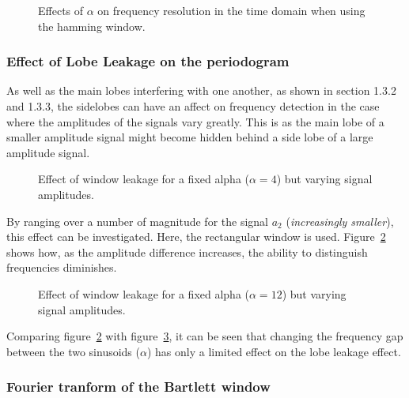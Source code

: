 \documentclass[main.tex]{subfiles}
\begin{document}
\begin{figure}[H]
	\centering 
	\resizebox{\textwidth}{!}{}
	\caption{Effects of $\alpha$ on frequency resolution in the time domain when using the hamming window.}
	\label{fig:q1_3_c}
\end{figure}


\subsubsection{Effect of Lobe Leakage on the periodogram}

As well as the main lobes interfering with one another, as shown in section 1.3.2 and 1.3.3, the sidelobes can have an affect on frequency detection in the case where the amplitudes of the signals vary greatly. This is as the main lobe of a smaller amplitude signal might become hidden behind a side lobe of a large amplitude signal.

\begin{figure}[H]
	\centering 
	\resizebox{\textwidth}{!}{}
	\caption{Effect of window leakage for a fixed alpha ($\alpha=4$) but varying signal amplitudes.}
	\label{fig:q1_3_d-4}
\end{figure}

By ranging over a number of magnitude for the signal $a_2$ (\textit{increasingly smaller}), this effect can be investigated. Here, the rectangular window is used. Figure~\ref{fig:q1_3_d-4} shows how, as the amplitude difference increases, the ability to distinguish frequencies diminishes.


\begin{figure}[H]
	\centering 
	\resizebox{\textwidth}{!}{}
	\caption{Effect of window leakage for a fixed alpha ($\alpha=12$) but varying signal amplitudes.}
	\label{fig:q1_3_d-12}
\end{figure}

Comparing figure~\ref{fig:q1_3_d-4} with figure~\ref{fig:q1_3_d-12}, it can be seen that changing the frequency gap between the two sinusoids ($\alpha$) has only a limited effect on the lobe leakage effect. %



\subsubsection{Fourier tranform of the Bartlett window}

\end{document}
